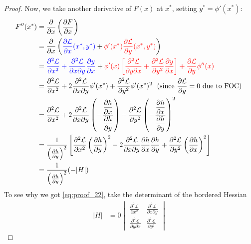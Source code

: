 \documentclass[10pt,a4paper]{book}
\newcommand{\red}[1]{\textcolor{red}{#1}}
\newcommand{\blue}[1]{\textcolor{blue}{#1}}
\theoremstyle{definition}\newtheorem{definition}{Definition}
\theoremstyle{definition}\newtheorem{fact}{Fact}
\theoremstyle{definition}\newtheorem{ex}{Ex.}
\theoremstyle{definition}\newtheorem{project}{Project}
\theoremstyle{definition}\newtheorem{problem}{Problem}
\theoremstyle{definition}\newtheorem{example}{Example}
\numberwithin{theorem}{chapter}
\numberwithin{corollary}{chapter}
\numberwithin{assumption}{chapter}
\numberwithin{definition}{chapter}
\numberwithin{prop}{chapter}
\numberwithin{notation}{chapter}
\numberwithin{problem}{chapter}
\numberwithin{example}{chapter}
\numberwithin{fact}{chapter}
\numberwithin{ex}{chapter}
\begin{document}
\begin{proof}
		Now, we take another derivative of $F(x)$ at $x^*$, setting $y^* = \phi'(x^*)$:
		\begin{align}
			F''(x^*) &= \frac{\partial }{\partial x} \left(\frac{\partial F}{\partial x}\right) \nonumber \\
			&=  \frac{\partial }{\partial x} \left(  \blue{\frac{\partial \mathcal{L}}{\partial x} (x^*,y^*)} + \red{\phi'(x^*) \frac{\partial \mathcal{L}}{\partial y} (x^*,y^*)}  \right) \nonumber \\
			&= \blue{\frac{\partial^2 \mathcal{L}}{\partial x^2} + \frac{\partial^2 \mathcal{L}}{\partial x\partial y} \frac{\partial y}{\partial x}} + \red{\phi'(x) \left[\frac{\partial^2\mathcal{L}}{\partial y\partial x} + \frac{\partial^2\mathcal{L}}{\partial y^2}\frac{\partial y}{\partial x} \right] + \frac{\partial\mathcal{L}}{\partial y} \phi''(x)} \nonumber \\
			&= \frac{\partial^2 \mathcal{L}}{\partial x^2} + 2\frac{\partial^2 \mathcal{L}}{\partial x\partial y} \phi'(x^*) + \frac{\partial^2 \mathcal{L}}{\partial y^2} \phi'(x^*)^2  \ \text{ (since $\frac{\partial \mathcal{L}}{\partial y} = 0$ due to FOC) }\nonumber \\ 
			&= \frac{\partial^2 \mathcal{L}}{\partial x^2} + 2\frac{\partial^2 \mathcal{L}}{\partial x\partial y} \left(- \dfrac{ \dfrac{\partial h}{\partial x} }{ \dfrac{\partial h}{\partial y} }\right) + \frac{\partial^2 \mathcal{L}}{\partial y^2} \left(- \dfrac{ \dfrac{\partial h}{\partial x} }{ \dfrac{\partial h}{\partial y} }\right)^2 \nonumber \\ 
			&=\frac{1}{\left(\frac{\partial h}{\partial y}\right)^2} \left[\frac{\partial^2 \mathcal{L}}{\partial x^2} \left(\frac{\partial h}{\partial y}\right)^2 - 2 \frac{\partial^2\mathcal{L}}{\partial x\partial y} \frac{\partial h}{\partial x} \frac{\partial h}{\partial y} + \frac{\partial^2 \mathcal{L}}{\partial y^2} \left(\frac{\partial h}{\partial x}\right)^2 \right] \nonumber \\ 
			&=\frac{1}{\left(\frac{\partial h}{\partial y}\right)^2} (-|H|)  \label{eq:proof_22}
		\end{align}
		To see why we got \eqref{eq:proof_22}, take the determinant of the bordered Hessian
		\begin{align*}
		|H| &= 	0 \begin{vmatrix}
				\frac{\partial^2 \mathcal{L}}{\partial x^2} & \frac{\partial^2 \mathcal{L}}{\partial x \partial y} \\
				\frac{\partial^2 \mathcal{L}}{\partial y \partial x} & \frac{\partial^2 \mathcal{L}}{\partial y^2}

\end{vmatrix}
\end{align*}
\end{proof}
\end{document}
